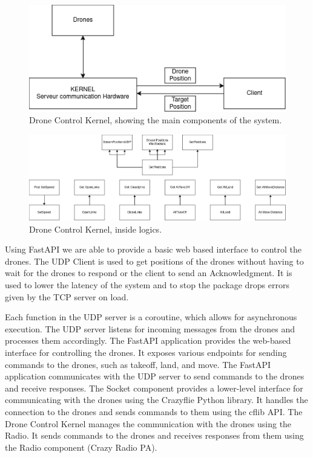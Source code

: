 \begin{figure}[htbp]
    \centerline{\includegraphics{images/DronecontrolKernel.png}}
    \caption{Drone Control Kernel, showing the main components of the system.}
    \label{fig}
    \end{figure}

\begin{figure}[htbp]
    \centerline{\includegraphics{images/DroneLogics.png}}
    \caption{Drone Control Kernel, inside logics.}
    \label{fig}
    \end{figure}
Using FastAPI we are able to provide a basic web based interface to control the drones. The UDP Client is used to get positions of the drones without having to wait for the drones to respond or the client to send an Acknowledgment. It is used to lower the latency of the system and to stop the package drops errors given by the TCP server on load.



Each function in the UDP server is a coroutine, which allows for asynchronous execution. The UDP server listens for incoming messages from the drones and processes them accordingly. The FastAPI application provides the web-based interface for controlling the drones. It exposes various endpoints for sending commands to the drones, such as takeoff, land, and move. The FastAPI application communicates with the UDP server to send commands to the drones and receive responses. The Socket component provides a lower-level interface for communicating with the drones using the Crazyflie Python library. It handles the connection to the drones and sends commands to them using the cflib \gls{API}. The Drone Control Kernel manages the communication with the drones using the Radio. It sends commands to the drones and receives responses from them using the Radio component (Crazy Radio PA).

